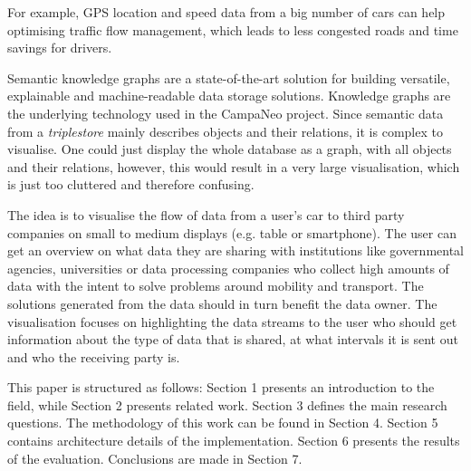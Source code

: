 \documentclass[../paper.tex]{subfiles}
\begin{document}
  For example, GPS location and speed data from a big number of cars can help
  optimising traffic flow management, which leads to less congested roads and
  time savings for drivers.

  Semantic knowledge graphs are a state-of-the-art solution for building
  versatile, explainable and machine-readable data storage solutions. Knowledge
  graphs are the underlying technology used in the CampaNeo project.  Since
  semantic data from a \textit{triplestore} mainly describes objects and their
  relations, it is complex to visualise. One could just display the whole
  database as a graph, with all objects and their relations, however, this
  would result in a very large visualisation, which is just too cluttered and
  therefore confusing. %

  The idea is to visualise the flow of data from a user's car to third party
  companies on small to medium displays (e.g. table or smartphone). The user
  can get an overview on what data they are sharing with institutions like
  governmental agencies, universities or data processing companies who collect
  high amounts of data with the intent to solve problems around mobility and
  transport. The solutions generated from the data should in turn benefit the
  data owner. The visualisation focuses on highlighting the data streams to
  the user who should get information about the type of data that is shared,
  at what intervals it is sent out and who the receiving party is.

  This paper is structured as follows: Section 1 presents an introduction to
  the field, while Section 2 presents related work. Section 3 defines the main
  research questions. The methodology of this work can be found in Section 4.
  Section 5 contains architecture details of the implementation.  Section 6
  presents the results of the evaluation. Conclusions are made in Section 7.
\end{document}
